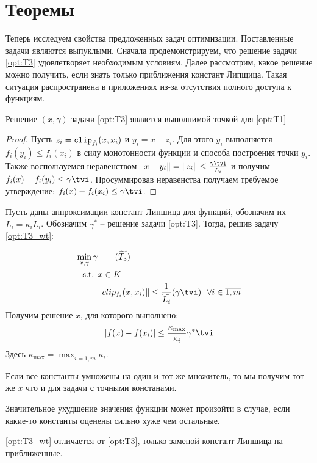 \section{Теоремы}\label{sec:theorems}

Теперь исследуем свойства предложенных задач оптимизации. Поставленные задачи являются выпуклыми. Сначала продемонстрируем, что решение задачи \ref{opt:T3} удовлетворяет необходимым условиям. Далее рассмотрим, какое решение можно получить, если знать только приближения констант Липщица. Такая ситуация распространена в приложениях из-за отсутствия полного доступа к функциям.

\begin{theorem}[Latypov, 2024]
    Решение $(x, \gamma)$ задачи \ref{opt:T3} является выполнимой точкой для  \ref{opt:T1}
\end{theorem}


\begin{proof}    
Пусть $z_i = \texttt{clip}_{f_i}(x, x_i)$ и $y_i = x - z_i$. Для этого $y_i$ выполняется $f_i(y_i) \leq f_i(x_i)$ в силу монотонности функции и способа построения точки $y_i$. Также воспользуемся неравенством $\| x - y_i\| = \|z_i\| \leq \frac{\gamma \tvi}{L_i}$ и получим $f_i(x) - f_i(y_i) \leq \gamma \tvi$. Просуммировав неравенства получаем требуемое утверждение:  $f_i(x) - f_i(x_i) \leq \gamma \tvi$.
\end{proof}

\newcommand{\sto}{\gamma^*} %
\newcommand{\stt}{\wt{\gamma}} %
\newcommand{\stf}{\overline{\gamma}} %
\newcommand{\km}{\kappa_{\max}}
\begin{theorem}[Latypov, 2024]
    Пусть даны аппроксимации констант Липшица для функций, обозначим их $\widetilde{L_i} = \kappa_i L_i$. Обозначим $\sto$ -- решение задачи \ref{opt:T3}.  Тогда, решив задачу \ref{opt:T3_wt}:
    
    \begin{align*}
    \min_{x, \gamma} \gamma & \tag{$\widetilde{T_3}$}\label{opt:T3_wt} \\
    \text{s.t. } &x \in K \\
                 &\|clip_{f_i}(x,x_i)\| \leq \frac{1}{\widetilde{L_i}}(\gamma \tvi) ~~ \forall i\in\overline{1,m}
    \end{align*}
    Получим решение $x$, для которого выполнено:
    $$|f(x) - f(x_i)| \leq \frac{\kappa_{\max}}{\kappa_i}\sto \tvi$$
    Здесь $\kappa_{\max} = \max_{i =\overline{1,m}} \kappa_i$.
\end{theorem}
\begin{comments}

        Если все константы умножены на один и тот же множитель, то мы получим тот же $x$ что и для задачи с точными констанами.     
        
        Значительное ухудшение значения функции может произойти в случае, если какие-то константы оценены сильно хуже чем остальные.
        
        \ref{opt:T3_wt} отличается от \ref{opt:T3}, только заменой констант Липшица на приближенные.
    
\end{comments}

